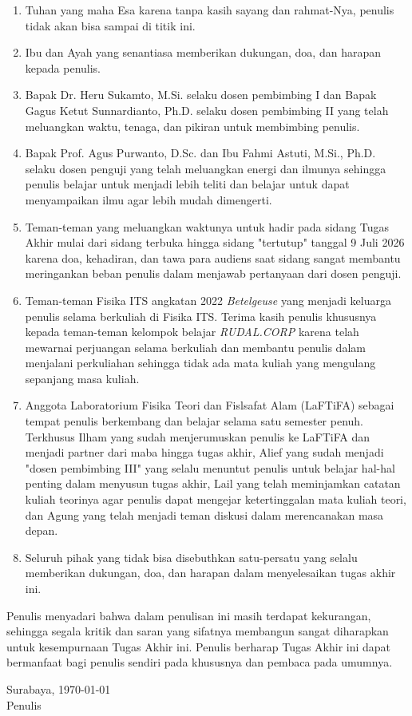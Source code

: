 \begin{enumerate}
    \item Tuhan yang maha Esa karena tanpa kasih sayang dan rahmat-Nya, penulis tidak akan bisa sampai di titik ini.
    \item Ibu dan Ayah yang senantiasa memberikan dukungan, doa, dan harapan kepada penulis.
    \item Bapak Dr. Heru Sukamto, M.Si. selaku dosen pembimbing I dan Bapak Gagus Ketut Sunnardianto, Ph.D. selaku dosen pembimbing II yang telah meluangkan waktu, tenaga, dan pikiran untuk membimbing penulis.
	\item Bapak Prof. Agus Purwanto, D.Sc. dan Ibu Fahmi Astuti, M.Si., Ph.D. selaku dosen penguji yang telah meluangkan energi dan ilmunya sehingga penulis belajar untuk menjadi lebih teliti dan belajar untuk dapat menyampaikan ilmu agar lebih mudah dimengerti.
	\item Teman-teman yang meluangkan waktunya untuk hadir pada sidang Tugas Akhir mulai dari sidang terbuka hingga sidang "tertutup" tanggal 9 Juli 2026 karena doa, kehadiran, dan tawa para audiens saat sidang sangat membantu meringankan beban penulis dalam menjawab pertanyaan dari dosen penguji. 
    \item Teman-teman Fisika ITS angkatan 2022 \textit{Betelgeuse} yang menjadi keluarga penulis selama berkuliah di Fisika ITS. Terima kasih penulis khususnya kepada teman-teman kelompok belajar \textit{RUDAL.CORP} karena telah mewarnai perjuangan selama berkuliah dan membantu penulis dalam menjalani perkuliahan sehingga tidak ada mata kuliah yang mengulang sepanjang masa kuliah. 
	\item Anggota Laboratorium Fisika Teori dan Fislsafat Alam (LaFTiFA) sebagai tempat penulis berkembang dan belajar selama satu semester penuh. Terkhusus Ilham yang sudah menjerumuskan penulis ke LaFTiFA dan menjadi partner dari maba hingga tugas akhir, Alief yang sudah menjadi "dosen pembimbing III" yang selalu menuntut penulis untuk belajar hal-hal penting dalam menyusun tugas akhir, Lail yang telah meminjamkan catatan kuliah teorinya agar penulis dapat mengejar ketertinggalan mata kuliah teori, dan Agung yang telah menjadi teman diskusi dalam merencanakan masa depan.
	\item Seluruh pihak yang tidak bisa disebuthkan satu-persatu yang selalu memberikan dukungan, doa, dan harapan dalam menyelesaikan tugas akhir ini.
\end{enumerate}
Penulis menyadari bahwa dalam penulisan ini masih terdapat kekurangan, sehingga segala kritik dan saran yang sifatnya membangun sangat diharapkan untuk kesempurnaan Tugas Akhir ini. Penulis berharap  Tugas Akhir ini dapat bermanfaat bagi penulis sendiri pada khususnya dan pembaca pada umumnya.

\begin{flushright}
	Surabaya, \today \\
	\vspace{2cm}
	Penulis
\end{flushright}